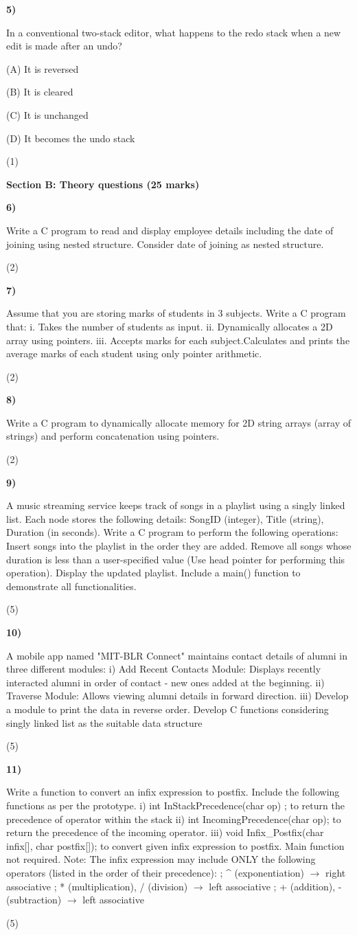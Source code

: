 \documentclass[10pt,a4paper]{article}
\newcommand{\question}[3]{\par\vspace{6pt}\noindent\begin{minipage}[t]{0.075\linewidth}\textbf{#1)}\end{minipage}\begin{minipage}[t]{0.855\linewidth}#3\end{minipage}\hfill\begin{minipage}[t]{0.055\linewidth}\raggedleft(#2)\end{minipage}\par}
\begin{document}
\question{5}{1}{In a conventional two-stack editor, what happens to the redo stack when a new edit is made after an undo?\par (A) It is reversed\par (B) It is cleared\par (C) It is unchanged\par (D) It becomes the undo stack}
\newpage\textbf{Section B: Theory questions (25 marks)}\par
\question{6}{2}{Write a C program to read and display employee details including the date of joining using nested structure. Consider date of joining as nested structure.}
\question{7}{2}{Assume that you are storing marks of students in 3 subjects. Write a C program that: i. Takes the number of students as input. ii. Dynamically allocates a 2D array using pointers. iii. Accepts marks for each subject.Calculates and prints the average marks of each student using only pointer arithmetic.}
\question{8}{2}{Write a C program to dynamically allocate memory for 2D string arrays (array of strings) and perform concatenation using pointers.}
\question{9}{5}{A music streaming service keeps track of songs in a playlist using a singly linked list. Each node stores the following details: SongID (integer), Title (string), Duration (in seconds). Write a C program to perform the following operations: Insert songs into the playlist in the order they are added. Remove all songs whose duration is less than a user-specified value (Use head pointer for performing this operation). Display the updated playlist. Include a main() function to demonstrate all functionalities.}
\question{10}{5}{A mobile app named "MIT-BLR Connect" maintains contact details of alumni in three different modules: i) Add Recent Contacts Module: Displays recently interacted alumni in order of contact - new ones added at the beginning. ii) Traverse Module: Allows viewing alumni details in forward direction. iii) Develop a module to print the data in reverse order. Develop C functions considering singly linked list as the suitable data structure}
\question{11}{5}{Write a function to convert an infix expression to postfix. Include the following functions as per the prototype. i) int InStackPrecedence(char op) ; to return the precedence of operator within the stack ii) int IncomingPrecedence(char op); to return the precedence of the incoming operator. iii) void Infix\_Postfix(char infix[], char postfix[]); to convert given infix expression to postfix. Main function not required. Note: The infix expression may include ONLY the following operators (listed in the order of their precedence): ; \textasciicircum{} (exponentiation) \(\to\) right associative ; * (multiplication), / (division) \(\to\) left associative ; + (addition), - (subtraction) \(\to\) left associative}
\end{document}
